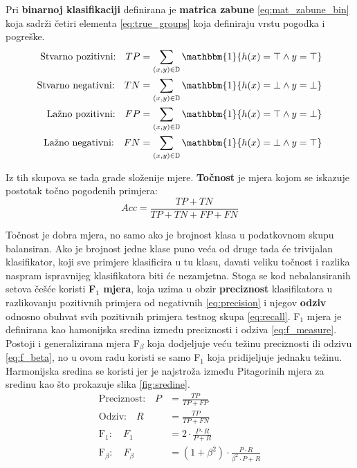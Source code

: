 \documentclass[times, utf8, numeric, diplomski]{fer}
\def\F1{F$_1$}
\begin{document}
Pri \textbf{binarnoj klasifikaciji} definirana je \textbf{matrica zabune} \eqref{eq:mat_zabune_bin} koja sadrži četiri elementa \eqref{eq:true_groups} koja definiraju vrstu pogodka i pogreške.
\begin{align}
\label{eq:true_groups}
\begin{split}
\text{Stvarno pozitivni:} \quad TP &= \sum_{(x,y)\in\mathbb{D}} \mathbbm{1} \{h(x) = \top \wedge y = \top \} \\
\text{Stvarno negativni:} \quad TN &= \sum_{(x,y)\in\mathbb{D}} \mathbbm{1} \{h(x) = \bot \wedge y = \bot \} \\
\text{Lažno pozitivni:}   \quad FP &= \sum_{(x,y)\in\mathbb{D}} \mathbbm{1} \{h(x) = \top \wedge y = \bot \} \\
\text{Lažno negativni:}   \quad FN &= \sum_{(x,y)\in\mathbb{D}} \mathbbm{1} \{h(x) = \bot \wedge y = \top \}
\end{split}
\end{align}

Iz tih skupova se tada grade složenije mjere. \textbf{Točnost} je mjera kojom se iskazuje postotak točno pogođenih primjera:
\begin{equation}
Acc = \frac{TP+TN}{TP+TN+FP+FN}
\end{equation}

Točnost je dobra mjera, no samo ako je brojnost klasa u podatkovnom skupu balansiran. Ako je brojnost jedne klase puno veća od druge tada će trivijalan klasifikator, koji sve primjere klasificira u tu klasu, davati veliku točnost i razlika naspram ispravnijeg klasifikatora biti će nezamjetna. Stoga se kod nebalansiranih setova češće koristi \textbf{\F1 mjera}, koja uzima u obzir \textbf{preciznost} klasifikatora u razlikovanju pozitivnih primjera od negativnih \eqref{eq:precision} i njegov \textbf{odziv} odnosno obuhvat svih pozitivnih primjera testnog skupa \eqref{eq:recall}. \F1 mjera je definirana kao hamonijska sredina između preciznosti i odziva \eqref{eq:f_measure}. Postoji i generalizirana mjera F$_\beta$ koja dodjeljuje veću težinu preciznosti ili odzivu \eqref{eq:f_beta}, no u ovom radu koristi se samo \F1 koja pridijeljuje jednaku težinu. Harmonijska sredina se koristi jer je najstroža između Pitagorinih mjera za sredinu kao što prokazuje slika \ref{fig:sredine}.
\begin{align}
\text{Preciznost:} \quad P &= \frac{TP}{TP+FP} \label{eq:precision} \\
\text{Odziv:} \quad R &= \frac{TP}{TP+FN} \label{eq:recall} \\
\text{F}_1: \quad F_1 &= 2 \cdot \frac{P \cdot R}{P + R} \label{eq:f_measure} \\
\text{F}_\beta: \quad F_\beta &= (1 + \beta^2) \cdot \frac{P \cdot R}{\beta ^2 \cdot P + R} \label{eq:f_beta}
\end{align}
\end{document}
